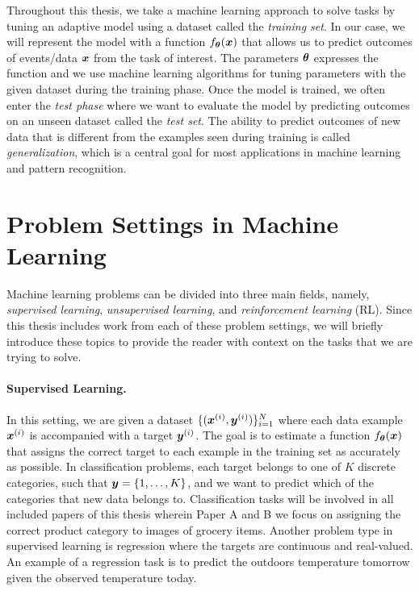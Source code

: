 
Throughout this thesis, we take a machine learning approach to solve tasks by tuning an adaptive model using a dataset called the \textit{training set}. In our case, we will represent the model with a function $f_{{\bm{\theta}}}({\bm{x}})$ that allows us to predict outcomes of events/data ${\bm{x}}$ from the task of interest. The parameters ${\bm{\theta}}$ expresses the function and we use machine learning algorithms for tuning parameters with the given dataset during the training phase. Once the model is trained, we often enter the \textit{test phase} where we want to evaluate the model by predicting outcomes on an unseen dataset called the \textit{test set}. The ability to predict outcomes of new data that is different from the examples seen during training is called \textit{generalization}, which is a central goal for most applications in machine learning and pattern recognition. 


\section{Problem Settings in Machine Learning}

Machine learning problems can be divided into three main fields, namely, \textit{supervised learning}, \textit{unsupervised learning}, and \textit{reinforcement learning} (RL). Since this thesis includes work from each of these problem settings, we will briefly introduce these topics to provide the reader with context on the tasks that we are trying to solve. 

\paragraph{Supervised Learning.} In this setting, we are given a dataset $\{({\bm{x}}^{(i)}, {\bm{y}}^{(i)})\}_{i=1}^{N}$ where each data example ${\bm{x}}^{(i)}$ is accompanied with a target ${\bm{y}}^{(i)}$. The goal is to estimate a function $f_{{\bm{\theta}}}({\bm{x}})$ that assigns the correct target to each example in the training set as accurately as possible. In classification problems, each target belongs to one of $K$ discrete categories, such that ${\bm{y}} = \{1, \dots, K\}$, and we want to predict which of the categories that new data belongs to. Classification tasks will be involved in all included papers of this thesis wherein Paper A and B we focus on assigning the correct product category to images of grocery items. Another problem type in supervised learning is regression where the targets are continuous and real-valued. An example of a regression task is to predict the outdoors temperature tomorrow given the observed temperature today. 

